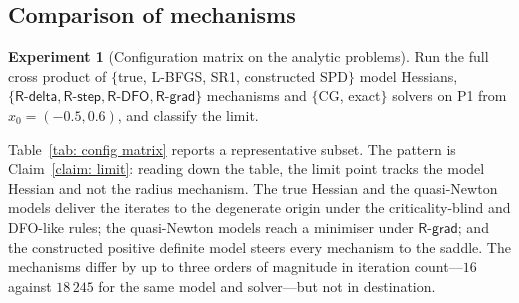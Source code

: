 \documentclass[11pt]{article}
\theoremstyle{plain}
\theoremstyle{definition}
\newtheorem{experiment}{Experiment}
\theoremstyle{remark}
\numberwithin{equation}{section}
\newcommand{\Rdelta}{\textsf{R-delta}}
\newcommand{\Rstep}{\textsf{R-step}}
\newcommand{\Rdfo}{\textsf{R-DFO}}
\newcommand{\Rgrad}{\textsf{R-grad}}
\begin{document}
\subsection{Comparison of mechanisms}
\label{sec: exp comparison}

\begin{experiment}[Configuration matrix on the analytic problems]
\label{exp: comparison}
Run the full cross product of $\{$true, L-BFGS, SR1, constructed SPD$\}$ model Hessians,
$\{\Rdelta, \Rstep, \Rdfo, \Rgrad\}$ mechanisms and $\{$CG, exact$\}$ solvers on P1 from
$x_0 = (-0.5,0.6)$, and classify the limit.
\end{experiment}

Table~\ref{tab: config matrix} reports a representative subset. The pattern is
Claim~\ref{claim: limit}: reading down the table, the limit point tracks the model Hessian and
not the radius mechanism. The true Hessian and the quasi-Newton models deliver the iterates to
the degenerate origin under the criticality-blind and DFO-like rules; the quasi-Newton models
reach a minimiser under $\Rgrad$; and the constructed positive definite model steers every
mechanism to the saddle. The mechanisms differ by up to three orders of magnitude in iteration
count---$16$ against $18\,245$ for the same model and solver---but not in destination.
\end{document}
